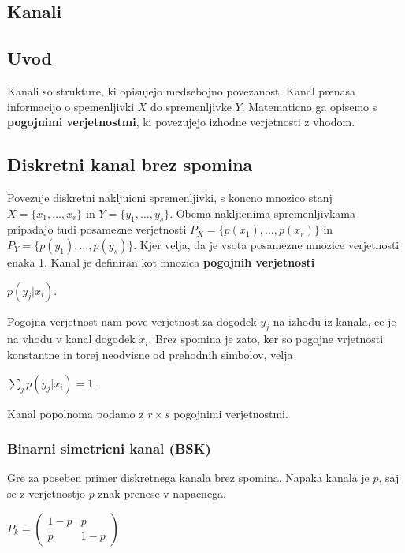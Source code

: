 \documentclass{article}
\begin{document}
\begin{multicols}{2}
	\section{Kanali}

	\subsection{Uvod}
	Kanali so strukture, ki opisujejo medsebojno povezanost. Kanal prenasa informacijo o spemenljivki
	$X$ do spremenljivke $Y$. Matematicno ga opisemo s \textbf{pogojnimi verjetnostmi}, ki povezujejo izhodne
	verjetnosti z vhodom.

	\subsection{Diskretni kanal brez spomina}
	Povezuje diskretni nakljuicni spremenljivki, s koncno mnozico stanj $X=\{x_1, \dots, x_r\}$ in $Y=\{y_1, \dots, y_s\}$.
	Obema nakljicnima spremenljivkama pripadajo tudi posamezne verjetnosti $P_X = \{p(x_1), \dots, p(x_r)\}$ in $P_Y = \{p(y_1), \dots, p(y_s)\}$. Kjer velja, da je vsota posamezne mnozice verjetnosti enaka 1. Kanal je definiran kot mnozica \textbf{pogojnih verjetnosti}
	\begin{center}
		$p(y_j | x_i)$.
	\end{center}
	Pogojna verjetnost nam pove verjetnost za dogodek $y_j$ na izhodu iz kanala, ce je na vhodu v kanal dogodek $x_i$.
	Brez spomina je zato, ker so pogojne vrjetnosti konstantne in torej neodvisne od prehodnih simbolov, velja
	\begin{center}
		\begin{math}
			\sum_j p(y_j | x_i) = 1.
		\end{math}
	\end{center}
	Kanal popolnoma podamo z $r \times s$ pogojnimi verjetnostmi.

	\subsubsection{Binarni simetricni kanal (BSK)}
	Gre za poseben primer diskretnega kanala brez spomina. Napaka kanala je $p$, saj se z verjetnostjo $p$ znak prenese
	v napacnega.
	\begin{center}
		\begin{math}
			P_k =
			\begin{pmatrix}
				1-p & p   \\
				p   & 1-p
			\end{pmatrix}
		\end{math}
	\end{center}


\end{multicols}
\end{document}
